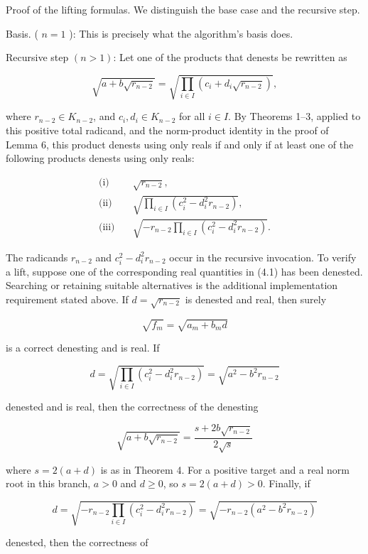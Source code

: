 \documentclass[11pt,letterpaper]{article}
\begin{document}
Proof of the lifting formulas. We distinguish the base case and the recursive step.

Basis. ( $n=1$ ): This is precisely what the algorithm's basis does.

Recursive step $(n>1)$: Let one of the products that denests be rewritten as

\[
\sqrt{a+b \sqrt{r_{n-2}}}=\sqrt{\prod_{i\in I}(c_i+d_i\sqrt{r_{n-2}})},
\]

where $r_{n-2} \in K_{n-2}$, and $c_{i}, d_{i} \in K_{n-2}$ for all $i \in I$. By Theorems 1--3, applied to this positive total radicand, and the norm-product identity in the proof of Lemma 6, this product denests using only reals if and only if at least one of the following products denests using only reals:

\begin{equation*}
\begin{aligned}
\text{(i)}\quad&\sqrt{r_{n-2}},\\
\text{(ii)}\quad&\sqrt{\prod_{i\in I}(c_i^2-d_i^2r_{n-2})},\\
\text{(iii)}\quad&\sqrt{-r_{n-2}\prod_{i\in I}(c_i^2-d_i^2r_{n-2})}.
\end{aligned}\tag{4.1}\label{eq:4.1}
\end{equation*}


The radicands $r_{n-2}$ and $c_i^2-d_i^2r_{n-2}$ occur in the recursive invocation. To verify a lift, suppose one of the corresponding real quantities in (4.1) has been denested. Searching or retaining suitable alternatives is the additional implementation requirement stated above. If $d=\sqrt{r_{n-2}}$ is denested and real, then surely

\[
\sqrt{f_{m}}=\sqrt{a_{m}+b_{m} d}
\]

is a correct denesting and is real. If

\[
d=\sqrt{\prod_{i\in I}(c_i^2-d_i^2r_{n-2})}=\sqrt{a^{2}-b^{2} r_{n-2}}
\]

denested and is real, then the correctness of the denesting

\[
\sqrt{a+b \sqrt{r_{n-2}}}=\frac{s+2 b \sqrt{r_{n-2}}}{2 \sqrt{s}}
\]

where $s=2(a+d)$ is as in Theorem 4. For a positive target and a real norm root in this branch, $a>0$ and $d\geq0$, so $s=2(a+d)>0$. Finally, if

\[
d=\sqrt{-r_{n-2}\prod_{i\in I}(c_i^2-d_i^2r_{n-2})}=\sqrt{-r_{n-2}\left(a^{2}-b^{2} r_{n-2}\right)}
\]

denested, then the correctness of
\end{document}
